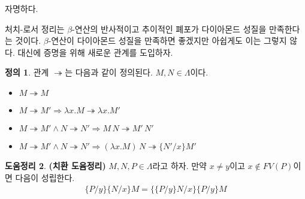 \documentclass[b5paper, 11pt]{book}
\theoremstyle{definition}
\newtheorem{defn}{정의}[chapter]
\newtheorem{lem}[defn]{도움정리}
\newenvironment{pf*}{\pushQED{\qed}\pf}
{\popQED\endpf}
\begin{document}
\begin{pf*}
    자명하다.
\end{pf*}
처치-로서 정리는 $\beta$-연산의 반사적이고 추이적인 폐포가 다이아몬드 성질을 만족한다는 것이다.
$\beta$-연산이 다이아몬드 성질을 만족하면 좋겠지만 아쉽게도 이는 그렇지 않다. 대신에 
증명을 위해 새로운 관계를 도입하자.
\begin{defn}
    관계 $\twoheadrightarrow$는 다음과 같이 정의된다. $M,N \in \Lambda$이다.
    \begin{itemize}
        \item $M \twoheadrightarrow M $
        \item $M \twoheadrightarrow M' \Rightarrow 
        \lambda x. M \twoheadrightarrow \lambda x. M'$
        \item $M \twoheadrightarrow M' \wedge N \twoheadrightarrow N' \Rightarrow
        M \, N \twoheadrightarrow M' \, N' $
        \item $M \twoheadrightarrow M' \wedge N \twoheadrightarrow N' \Rightarrow
        (\lambda x. M)\, N \twoheadrightarrow \{N'/x\}M'$
    \end{itemize}
\end{defn}
\begin{lem}
    \textbf{(치환 도윰정리)} $M, N, P \in \Lambda$라고 하자. 만약 $x \neq y$이고 $x \notin
    FV(P)$이면 다음이 성립한다.
    \begin{align*}
        \{P / y\} \{ N / x\} M = \{ \{P / y\} N / x \} \{P / y\}  M
    \end{align*}
\end{lem}
\end{document}
